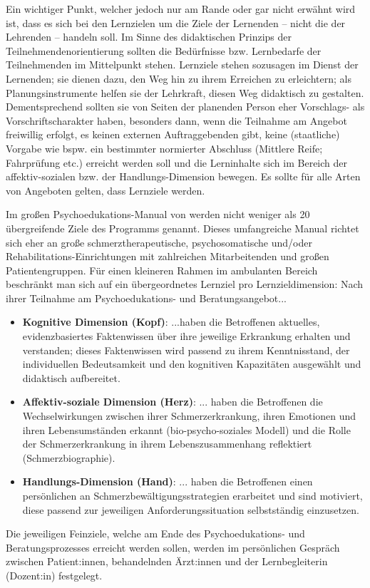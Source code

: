 \documentclass[
  twoside,
  parskip=half-,
  paper=176mm:246mm,
  BCOR=14mm,
  DIV=14,
]{scrreprt}
\begin{document}
Ein wichtiger Punkt, welcher jedoch nur am Rande \autocite[vgl.][99]{schlutz} oder gar nicht erwähnt wird \autocite[vgl.][]{reich-claassen} ist, dass es sich bei den Lernzielen um die Ziele der Lernenden -- nicht die der Lehrenden -- handeln soll. Im Sinne des didaktischen Prinzips der Teilnehmendenorientierung sollten die Bedürfnisse bzw. Lernbedarfe der Teilnehmenden im Mittelpunkt stehen. Lernziele stehen sozusagen im Dienst der Lernenden; sie dienen dazu, den Weg hin zu ihrem Erreichen zu erleichtern; als Planungsinstrumente helfen sie der Lehrkraft, diesen Weg didaktisch zu gestalten. Dementsprechend sollten sie von Seiten der planenden Person eher Vorschlags- als Vorschriftscharakter haben, besonders dann, wenn die Teilnahme am Angebot freiwillig erfolgt, es keinen externen Auftraggebenden gibt, keine (staatliche) Vorgabe wie bspw. ein bestimmter normierter Abschluss (Mittlere Reife; Fahrprüfung etc.) erreicht werden soll und die Lerninhalte sich im Bereich der affektiv-sozialen bzw. der Handlungs-Dimension bewegen. Es sollte für alle Arten von Angeboten gelten, dass Lernziele  werden. 

\begin{praxis}
  Im großen Psychoedukations-Manual von \citeauthor{wachter} werden nicht weniger als 20 übergreifende Ziele des Programms genannt. Dieses umfangreiche Manual richtet sich eher an große schmerztherapeutische, psychosomatische und/oder Rehabilitations-Einrichtungen mit zahlreichen Mitarbeitenden und großen Patientengruppen. Für einen kleineren Rahmen im ambulanten Bereich beschränkt man sich auf ein übergeordnetes Lernziel pro Lernzieldimension:
  Nach ihrer Teilnahme am Psychoedukations- und Beratungsangebot...
  \begin{itemize}
    \item \textbf{Kognitive Dimension (Kopf)}: ...haben die Betroffenen aktuelles, evidenzbasiertes Faktenwissen über ihre jeweilige Erkrankung erhalten und verstanden; dieses Faktenwissen wird passend zu ihrem Kenntnisstand, der individuellen Bedeutsamkeit und den kognitiven Kapazitäten ausgewählt und didaktisch aufbereitet. 
    \item \textbf{Affektiv-soziale Dimension (Herz)}: ... haben die Betroffenen die Wechselwirkungen zwischen ihrer Schmerzerkrankung, ihren Emotionen und ihren Lebensumständen erkannt (bio-psycho-soziales Modell) und die Rolle der Schmerzerkrankung in ihrem Lebenszusammenhang reflektiert (Schmerzbiographie).
    \item \textbf{Handlungs-Dimension (Hand)}: ... haben die Betroffenen einen persönlichen  an Schmerzbewältigungsstrategien erarbeitet und sind motiviert, diese passend zur jeweiligen Anforderungssituation selbstständig einzusetzen.
  \end{itemize}

  Die jeweiligen Feinziele, welche am Ende des Psychoedukations- und Beratungsprozesses erreicht werden sollen, werden im persönlichen Gespräch zwischen Patient:innen, behandelnden Ärzt:innen und der Lernbegleiterin (Dozent:in) festgelegt. 
\end{praxis}
\end{document}
